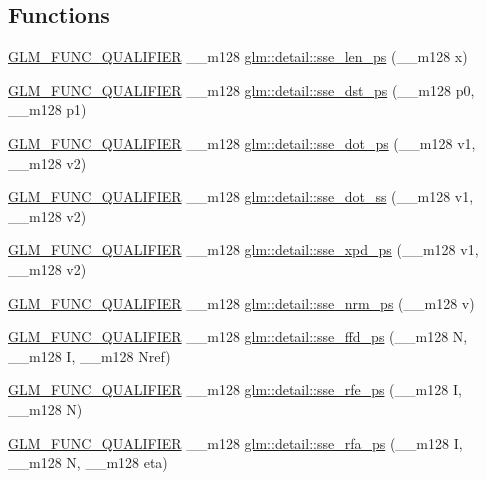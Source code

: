 \subsection*{Functions}
\begin{DoxyCompactItemize}
\item 
\hyperlink{setup_8hpp_a33fdea6f91c5f834105f7415e2a64407}{G\+L\+M\+\_\+\+F\+U\+N\+C\+\_\+\+Q\+U\+A\+L\+I\+F\+I\+ER} \+\_\+\+\_\+m128 \hyperlink{namespaceglm_1_1detail_aa49baf7bcbe9eb783a85bcd3ce8d8dba}{glm\+::detail\+::sse\+\_\+len\+\_\+ps} (\+\_\+\+\_\+m128 x)
\item 
\hyperlink{setup_8hpp_a33fdea6f91c5f834105f7415e2a64407}{G\+L\+M\+\_\+\+F\+U\+N\+C\+\_\+\+Q\+U\+A\+L\+I\+F\+I\+ER} \+\_\+\+\_\+m128 \hyperlink{namespaceglm_1_1detail_a9d4832acb69aa3f67d6e06c64b29dddd}{glm\+::detail\+::sse\+\_\+dst\+\_\+ps} (\+\_\+\+\_\+m128 p0, \+\_\+\+\_\+m128 p1)
\item 
\hyperlink{setup_8hpp_a33fdea6f91c5f834105f7415e2a64407}{G\+L\+M\+\_\+\+F\+U\+N\+C\+\_\+\+Q\+U\+A\+L\+I\+F\+I\+ER} \+\_\+\+\_\+m128 \hyperlink{namespaceglm_1_1detail_ad4dfd210b559dcff4cbc4a674477b90b}{glm\+::detail\+::sse\+\_\+dot\+\_\+ps} (\+\_\+\+\_\+m128 v1, \+\_\+\+\_\+m128 v2)
\item 
\hyperlink{setup_8hpp_a33fdea6f91c5f834105f7415e2a64407}{G\+L\+M\+\_\+\+F\+U\+N\+C\+\_\+\+Q\+U\+A\+L\+I\+F\+I\+ER} \+\_\+\+\_\+m128 \hyperlink{namespaceglm_1_1detail_a794070b64c8a2bd03e393c79be9ed17e}{glm\+::detail\+::sse\+\_\+dot\+\_\+ss} (\+\_\+\+\_\+m128 v1, \+\_\+\+\_\+m128 v2)
\item 
\hyperlink{setup_8hpp_a33fdea6f91c5f834105f7415e2a64407}{G\+L\+M\+\_\+\+F\+U\+N\+C\+\_\+\+Q\+U\+A\+L\+I\+F\+I\+ER} \+\_\+\+\_\+m128 \hyperlink{namespaceglm_1_1detail_a0692599f2cf8b5a9fd64ccf7023805c7}{glm\+::detail\+::sse\+\_\+xpd\+\_\+ps} (\+\_\+\+\_\+m128 v1, \+\_\+\+\_\+m128 v2)
\item 
\hyperlink{setup_8hpp_a33fdea6f91c5f834105f7415e2a64407}{G\+L\+M\+\_\+\+F\+U\+N\+C\+\_\+\+Q\+U\+A\+L\+I\+F\+I\+ER} \+\_\+\+\_\+m128 \hyperlink{namespaceglm_1_1detail_a9f1826e935d79fc46faaf70499cba320}{glm\+::detail\+::sse\+\_\+nrm\+\_\+ps} (\+\_\+\+\_\+m128 v)
\item 
\hyperlink{setup_8hpp_a33fdea6f91c5f834105f7415e2a64407}{G\+L\+M\+\_\+\+F\+U\+N\+C\+\_\+\+Q\+U\+A\+L\+I\+F\+I\+ER} \+\_\+\+\_\+m128 \hyperlink{namespaceglm_1_1detail_ace9256f388e836f9411a6eb92bed1a8a}{glm\+::detail\+::sse\+\_\+ffd\+\_\+ps} (\+\_\+\+\_\+m128 N, \+\_\+\+\_\+m128 I, \+\_\+\+\_\+m128 Nref)
\item 
\hyperlink{setup_8hpp_a33fdea6f91c5f834105f7415e2a64407}{G\+L\+M\+\_\+\+F\+U\+N\+C\+\_\+\+Q\+U\+A\+L\+I\+F\+I\+ER} \+\_\+\+\_\+m128 \hyperlink{namespaceglm_1_1detail_a48dc48d40e141bd2fff6b9c88b7e05e4}{glm\+::detail\+::sse\+\_\+rfe\+\_\+ps} (\+\_\+\+\_\+m128 I, \+\_\+\+\_\+m128 N)
\item 
\hyperlink{setup_8hpp_a33fdea6f91c5f834105f7415e2a64407}{G\+L\+M\+\_\+\+F\+U\+N\+C\+\_\+\+Q\+U\+A\+L\+I\+F\+I\+ER} \+\_\+\+\_\+m128 \hyperlink{namespaceglm_1_1detail_a5086fa9f09dcfec333b9eebeae468767}{glm\+::detail\+::sse\+\_\+rfa\+\_\+ps} (\+\_\+\+\_\+m128 I, \+\_\+\+\_\+m128 N, \+\_\+\+\_\+m128 eta)
\end{DoxyCompactItemize}
